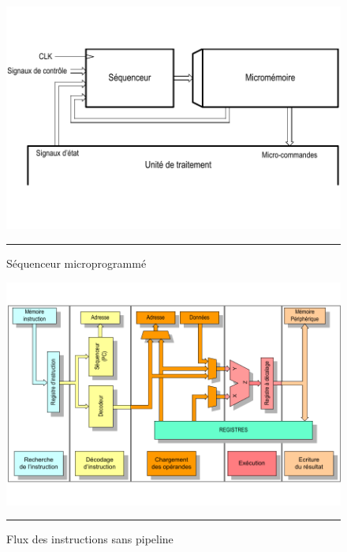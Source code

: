 \begin{figure}[htb]
  \centering
  \includegraphics[angle=0, width=12cm, trim=0 40 0 40,clip]{./Figures/cpu/Sequenceur2.pdf}
  \rule{35em}{0.5pt}
  \caption[sm]{Séquenceur microprogrammé}
  \label{fig:sm}
\end{figure}

\begin{figure}[htb]
  \centering
  \includegraphics[angle=0, width=12cm, trim=0 20 0 20,clip]{./Figures/cpu/withoutpipeline1.pdf}
  \rule{35em}{0.5pt}
  \caption[flux1]{Flux des instructions sans pipeline}
  \label{fig:flux1}
\end{figure}


